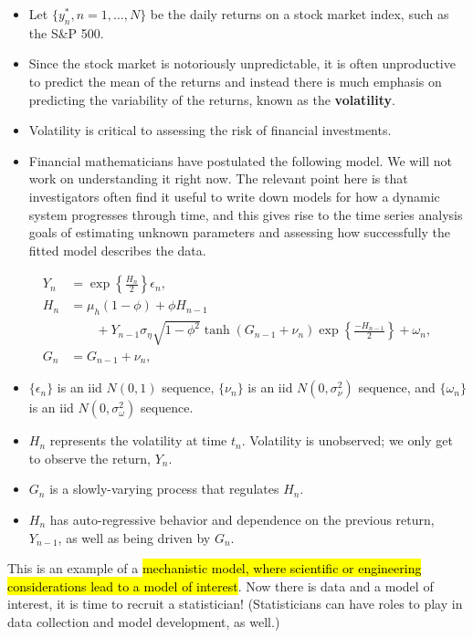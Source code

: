 \documentclass[]{article}
\begin{document}
\begin{itemize}
\item
  Let \(\{y^*_n,n=1,\dots,N\}\) be the daily returns on a stock market
  index, such as the S\&P 500.
\item
  Since the stock market is notoriously unpredictable, it is often
  unproductive to predict the mean of the returns and instead there is
  much emphasis on predicting the variability of the returns, known as
  the \textbf{volatility}.
\item
  Volatility is critical to assessing the risk of financial investments.
\item
  Financial mathematicians have postulated the following model. We will
  not work on understanding it right now. The relevant point here is
  that investigators often find it useful to write down models for how a
  dynamic system progresses through time, and this gives rise to the
  time series analysis goals of estimating unknown parameters and
  assessing how successfully the fitted model describes the data.
\end{itemize}

\[
\begin{aligned} Y_n &= \exp\left\{\frac{H_n}{2}\right\} \epsilon_n, \\
H_n &= \mu_h(1-\phi) + \phi H_{n-1} \\
&\quad\quad +  Y_{n-1}\sigma_\eta\sqrt{1-\phi^2}\tanh(G_{n-1}+\nu_n)\exp\left\{\frac{-H_{n-1}}{2}\right\} + \omega_n,\\
G_n &= G_{n-1}+\nu_n,
\end{aligned}
\]

\begin{itemize}
\item
  \(\{\epsilon_n\}\) is an iid \(N(0,1)\) sequence, \(\{\nu_n\}\) is an
  iid \(N(0,\sigma_{\nu}^2)\) sequence, and \(\{\omega_n\}\) is an iid
  \(N(0,\sigma_\omega^2)\) sequence.
\item
  \(H_n\) represents the volatility at time \(t_n\). Volatility is
  unobserved; we only get to observe the return, \(Y_n\).
\item
  \(G_n\) is a slowly-varying process that regulates \(H_n\).
\item
  \(H_n\) has auto-regressive behavior and dependence on the previous
  return, \(Y_{n-1}\), as well as being driven by \(G_n\).
\end{itemize}

This is an example of a \hl{mechanistic model, where scientific or
engineering considerations lead to a model of interest}. Now there is
data and a model of interest, it is time to recruit a statistician!
(Statisticians can have roles to play in data collection and model
development, as well.)
\end{document}
